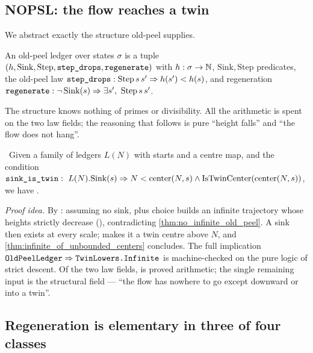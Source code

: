 \subsection{NOPSL: the flow reaches a twin}

We abstract exactly the structure old-peel supplies.

\begin{definition}\label{def:oldpeelledger}
An old-peel ledger over states $\sigma$ is a tuple $(h,\mathrm{Sink},\mathrm{Step},\texttt{step\_drops},
\texttt{regenerate})$ with $h:\sigma\to\mathbb{N}$, $\mathrm{Sink},\mathrm{Step}$ predicates, the old-peel law
$\texttt{step\_drops}:\mathrm{Step}\,s\,s'\Rightarrow h(s')<h(s)$, and regeneration
$\texttt{regenerate}:\neg\,\mathrm{Sink}(s)\Rightarrow\exists s',\ \mathrm{Step}\,s\,s'$.
\end{definition}

The structure knows nothing of primes or divisibility. All the arithmetic is spent on the two law
fields; the reasoning that follows is pure ``height falls'' and ``the flow does not hang''.

\begin{theorem}\label{thm:twin_primes_of_nopsl}
\green{}\ Given a family of ledgers $L(N)$ with starts and a centre map, and the condition
$\code{sink\_is\_twin}:\ L(N).\mathrm{Sink}(s)\Rightarrow N<\mathrm{center}(N,s)\wedge
\mathrm{IsTwinCenter}(\mathrm{center}(N,s))$, we have .
\end{theorem}

\emph{Proof idea.} By : assuming no sink,  plus choice builds
an infinite trajectory whose heights strictly decrease (), contradicting
\cref{thm:no_infinite_old_peel}. A sink then exists at every scale;  makes it a
twin centre above $N$, and \cref{thm:infinite_of_unbounded_centers} concludes. The full
implication $\texttt{OldPeelLedger}\Rightarrow\texttt{TwinLowers.Infinite}$ is machine-checked on the pure
logic of strict descent. Of the two law fields,  is proved arithmetic; the single
remaining input is the structural field  --- ``the flow has nowhere to go except
downward or into a twin''.

\subsection{Regeneration is elementary in three of four classes}

